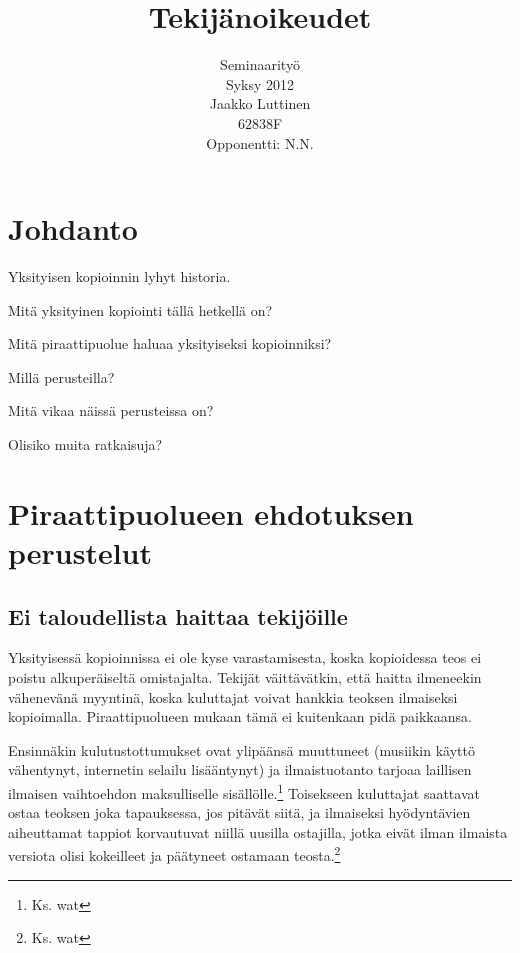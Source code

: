\documentclass[titlepage,12pt]{article}
\title{Tekijänoikeudet}
\author{
  Seminaarityö\\
  \hfill Syksy 2012\\
  Jaakko Luttinen\\
  $62838$F\\
  Opponentti: N.N.
}
\date{ }
\begin{document}
\renewcommand\refname{Lähteet}
\renewcommand\bibname{Lähteet}


\maketitle

\tableofcontents
\pagebreak


\section{Johdanto}


Yksityisen kopioinnin lyhyt historia.

Mitä yksityinen kopiointi tällä hetkellä on?

Mitä piraattipuolue haluaa yksityiseksi kopioinniksi?

Millä perusteilla?

Mitä vikaa näissä perusteissa on?

Olisiko muita ratkaisuja?

\section{Piraattipuolueen ehdotuksen perustelut}

\subsection{Ei taloudellista haittaa tekijöille}

Yksityisessä kopioinnissa ei ole kyse varastamisesta, koska
kopioidessa teos ei poistu alkuperäiseltä omistajalta.  Tekijät
väittävätkin, että haitta ilmeneekin vähenevänä myyntinä, koska
kuluttajat voivat hankkia teoksen ilmaiseksi kopioimalla.
Piraattipuolueen mukaan tämä ei kuitenkaan pidä paikkaansa.

Ensinnäkin kulutustottumukset ovat ylipäänsä muuttuneet (musiikin
käyttö vähentynyt, internetin selailu lisääntynyt) ja ilmaistuotanto
tarjoaa laillisen ilmaisen vaihtoehdon maksulliselle
sisällölle.\footnote{Ks. wat} Toisekseen kuluttajat saattavat ostaa
teoksen joka tapauksessa, jos pitävät siitä, ja ilmaiseksi
hyödyntävien aiheuttamat tappiot korvautuvat niillä uusilla ostajilla,
jotka eivät ilman ilmaista versiota olisi kokeilleet ja päätyneet
ostamaan teosta.\footnote{Ks. wat}
\end{document}
